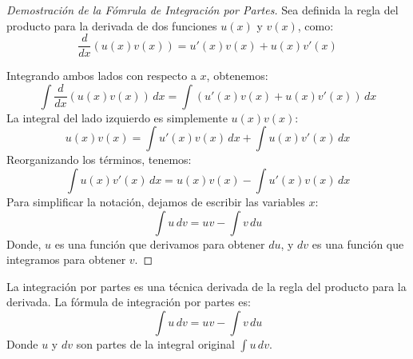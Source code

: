 \begin{proof}[Demostración de la Fómrula de Integración por Partes]
    
    Sea definida la regla del producto para la derivada de dos funciones \( u(x) \) y \( v(x) \), como:
    \begin{equation*}
    \frac{d}{dx} \left( u(x) v(x) \right) = u'(x) v(x) + u(x) v'(x)
\end{equation*}

Integrando ambos lados con respecto a \( x \), obtenemos:
\begin{equation*}
    \int \frac{d}{dx} \left( u(x) v(x) \right) \, dx = \int \left( u'(x) v(x) + u(x) v'(x) \right) \, dx
\end{equation*}
La integral del lado izquierdo es simplemente \( u(x) v(x) \):
\begin{equation*}
    u(x) v(x) = \int u'(x) v(x) \, dx + \int u(x) v'(x) \, dx
\end{equation*}
Reorganizando los términos, tenemos:
\begin{equation*}
    \int u(x) v'(x) \, dx = u(x) v(x) - \int u'(x) v(x) \, dx
\end{equation*}
Para simplificar la notación, dejamos de escribir las variables \( x \):
\begin{equation*}
    \int u \, dv = uv - \int v \, du
\end{equation*}
Donde, \( u \) es una función que derivamos para obtener \( du \), y \( dv \) es una función que integramos para obtener \( v \).
\end{proof}
\begin{definition}
    La integración por partes es una técnica derivada de la regla del producto para la derivada. La fórmula de integración por partes es:
    \begin{equation}
        \int u \, dv = uv - \int v \, du
    \end{equation}
    Donde \( u \) y \( dv \) son partes de la integral original \( \int u \, dv \).    
\end{definition}
